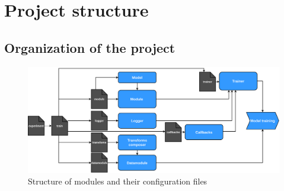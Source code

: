 \chapter{Project structure}

\section{Organization of the project}

\begin{figure}
    \centering
    \includegraphics[width=\linewidth]{images/Module.drawio.pdf}
    \caption{Structure of modules and their configuration files}
    \label{fig:structure_modules}
\end{figure}

